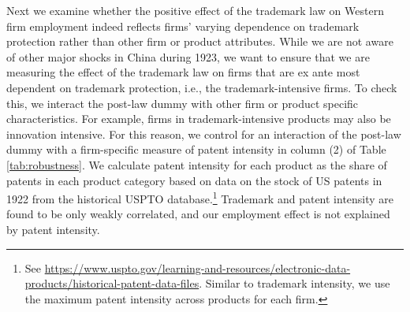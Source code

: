 \documentclass[12pt]{article}
\begin{document}
Next we examine whether the positive effect of the trademark law on Western firm employment indeed reflects firms' varying dependence on trademark protection rather than other firm or product attributes. While we are not aware of other major shocks in China during 1923, we want to ensure that we are measuring the effect of the trademark law on firms that are ex ante most dependent on trademark protection, i.e., the trademark-intensive firms. To check this, we interact the post-law dummy with other firm or product specific characteristics. For example, firms in trademark-intensive products may also be innovation intensive. For this reason, we control for an interaction of the post-law dummy with a firm-specific measure of patent intensity in column (2) of Table \ref{tab:robustness}. We calculate patent intensity for each product as the share of patents in each product category based on data on the stock of US patents in 1922 from the historical USPTO database.\footnote{See \url{https://www.uspto.gov/learning-and-resources/electronic-data-products/historical-patent-data-files}. Similar to trademark intensity, we use the maximum patent intensity across products for each firm.} Trademark and patent intensity are found to be only weakly correlated, and our employment effect is not explained by patent intensity. 
\end{document}
